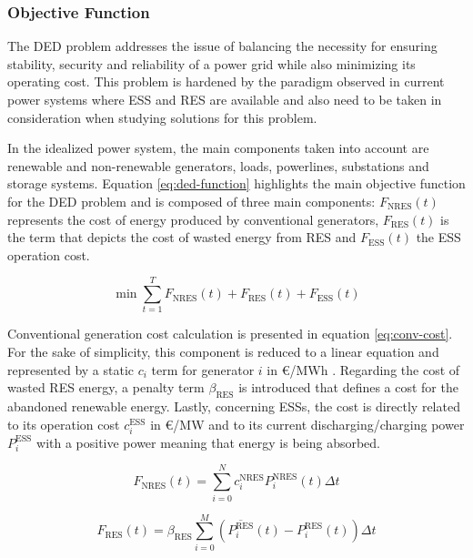 \subsubsection{Objective Function}

The \ac{DED} problem addresses the issue of balancing the necessity for ensuring stability, security and reliability of a power grid while also minimizing its operating cost. This problem is hardened by the paradigm observed in current power systems where \ac{ESS} and \ac{RES} are available and also need to be taken in consideration when studying solutions for this problem. \par
In the idealized power system, the main components taken into account are renewable and non-renewable generators, loads, powerlines, substations and storage systems.
Equation \ref{eq:ded-function} highlights the main objective function for the \ac{DED} problem and is composed of three main components: $F_\text{NRES}(t)$ represents the cost of energy produced by conventional generators, $F_\text{RES}(t)$ is the term that depicts the cost of wasted energy from \ac{RES} and $F_{\text{ESS}}(t)$ the \ac{ESS} operation cost. \par

\begin{equation} \label{eq:ded-function}
 \min\sum^T_{t=1}F_\text{NRES}(t) + F_{\text{RES}}(t) + F_{\text{ESS}}(t)
\end{equation}

Conventional generation cost calculation is presented in equation \ref{eq:conv-cost}. For the sake of simplicity, this component is reduced to a linear equation and represented by a static $c_i$ term for generator $i$ in €/MWh . Regarding the cost of wasted \ac{RES} energy, a penalty term $\beta_\text{RES}$ is introduced that defines a cost for the abandoned renewable energy. Lastly, concerning \acp{ESS}, the cost is directly related to its operation cost $c^\text{ESS}_i$ in €/MW and to its current discharging/charging power $P^\text{ESS}_i$ with a positive power meaning that energy is being absorbed.

\begin{equation} \label{eq:conv-cost}
	F_\text{NRES}(t) = \sum^N_{i=0} c^\text{NRES}_i P^\text{NRES}_i(t) \Delta t
\end{equation}

\begin{equation} \label{eq:res-cost}
	F_\text{RES}(t) = \beta_\text{RES} \sum^M_{i=0}  (\overline{P^\text{RES}_i}(t) - P^\text{RES}_i(t)) \Delta t 
\end{equation}

